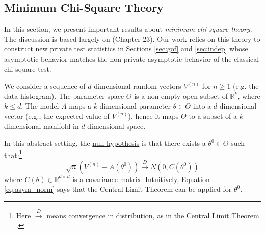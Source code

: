 \documentclass[twoside,letterpaper]{article} \usepackage{aistats2017}
\theoremstyle{definition}
\theoremstyle{remark}
\begin{document}
\subsection{Minimum Chi-Square Theory}\label{subsec:minchi}
In this section, we present important results about \emph{minimum chi-square theory}.
The discussion is based largely on \cite{Ferg96} (Chapter 23). Our work relies on this theory to construct new private test statistics in Sections \ref{sec:gof} and \ref{sec:indep} whose asymptotic behavior matches the non-private asymptotic behavior of the classical chi-square test.

We consider a sequence of $d$-dimensional random vectors ${V^{({n})}}$ for $n \geq 1$ (e.g. the data histogram). The parameter space $\Theta$ is a non-empty open subset of ${\mathbb{R}}^k$, where $k\leq d$. The model $A$ maps a $k$-dimensional parameter $\theta\in \Theta$ into a $d$-dimensional vector (e.g., the expected value of ${V^{({n})}}$), hence it maps $\Theta$ to a subset of a $k$-dimensional manifold in $d$-dimensional space.

In this abstract setting, the \underline{null hypothesis} is that there exists a ${\theta^0}\in\Theta$ such that:\footnote{Here $\stackrel{D}{\to}$ means convergence in distribution, as in the Central Limit Theorem \cite{Ferg96}.} 
\begin{equation}
\sqrt{n}\left({V^{({n})}} - A({\theta^0}) \right) \stackrel{D}{\to} N(0, C({\theta^0}))
\label{eq:asym_norm}
\end{equation}
where $C(\theta) \in {\mathbb{R}}^{d\times d}$ is a covariance matrix.
Intuitively, Equation \ref{eq:asym_norm} says that the Central Limit Theorem can be applied for ${\theta^0}$.
\end{document}
